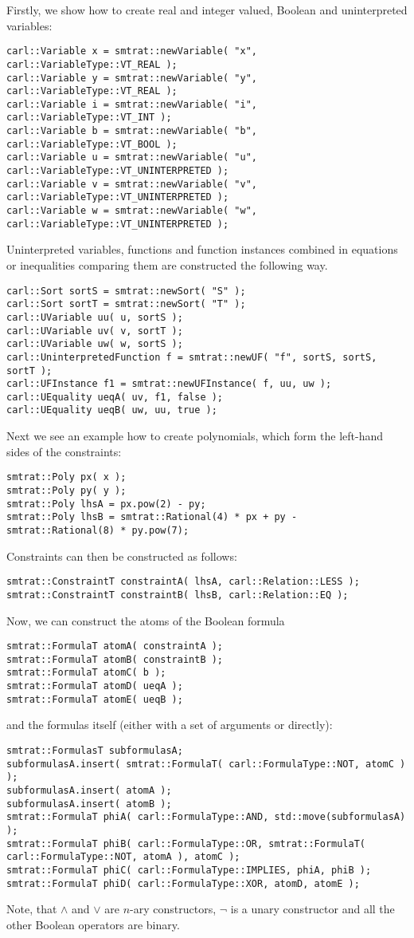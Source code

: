 Firstly, we show how to create real and integer valued, Boolean and uninterpreted variables:
\scriptsize
\begin{verbatim}
carl::Variable x = smtrat::newVariable( "x", carl::VariableType::VT_REAL );
carl::Variable y = smtrat::newVariable( "y", carl::VariableType::VT_REAL );
carl::Variable i = smtrat::newVariable( "i", carl::VariableType::VT_INT );
carl::Variable b = smtrat::newVariable( "b", carl::VariableType::VT_BOOL );
carl::Variable u = smtrat::newVariable( "u", carl::VariableType::VT_UNINTERPRETED );
carl::Variable v = smtrat::newVariable( "v", carl::VariableType::VT_UNINTERPRETED );
carl::Variable w = smtrat::newVariable( "w", carl::VariableType::VT_UNINTERPRETED );
\end{verbatim}
\normalsize
Uninterpreted variables, functions and function instances combined in equations or inequalities comparing them are constructed the following way.
\scriptsize
\begin{verbatim}
carl::Sort sortS = smtrat::newSort( "S" );
carl::Sort sortT = smtrat::newSort( "T" );
carl::UVariable uu( u, sortS );
carl::UVariable uv( v, sortT );
carl::UVariable uw( w, sortS );
carl::UninterpretedFunction f = smtrat::newUF( "f", sortS, sortS, sortT );
carl::UFInstance f1 = smtrat::newUFInstance( f, uu, uw );
carl::UEquality ueqA( uv, f1, false );
carl::UEquality ueqB( uw, uu, true );
\end{verbatim}
\normalsize
Next we see an example how to create polynomials, which form the left-hand sides of the constraints:
\scriptsize
\begin{verbatim}
smtrat::Poly px( x );
smtrat::Poly py( y );
smtrat::Poly lhsA = px.pow(2) - py;
smtrat::Poly lhsB = smtrat::Rational(4) * px + py - smtrat::Rational(8) * py.pow(7);
\end{verbatim}
\normalsize
Constraints can then be constructed as follows:
\scriptsize
\begin{verbatim}
smtrat::ConstraintT constraintA( lhsA, carl::Relation::LESS );
smtrat::ConstraintT constraintB( lhsB, carl::Relation::EQ );
\end{verbatim}
\normalsize
Now, we can construct the atoms of the Boolean formula
\scriptsize
\begin{verbatim}
smtrat::FormulaT atomA( constraintA );
smtrat::FormulaT atomB( constraintB );
smtrat::FormulaT atomC( b );
smtrat::FormulaT atomD( ueqA );
smtrat::FormulaT atomE( ueqB );
\end{verbatim}
\normalsize
and the formulas itself (either with a set of arguments or directly):
\scriptsize
\begin{verbatim}
smtrat::FormulasT subformulasA;
subformulasA.insert( smtrat::FormulaT( carl::FormulaType::NOT, atomC ) );
subformulasA.insert( atomA );
subformulasA.insert( atomB );
smtrat::FormulaT phiA( carl::FormulaType::AND, std::move(subformulasA) );
smtrat::FormulaT phiB( carl::FormulaType::OR, smtrat::FormulaT( carl::FormulaType::NOT, atomA ), atomC );
smtrat::FormulaT phiC( carl::FormulaType::IMPLIES, phiA, phiB );
smtrat::FormulaT phiD( carl::FormulaType::XOR, atomD, atomE );
\end{verbatim}
\normalsize
Note, that $\land$ and $\lor$ are $n$-ary constructors, $\neg$ is a unary constructor and all the other Boolean operators are binary.

